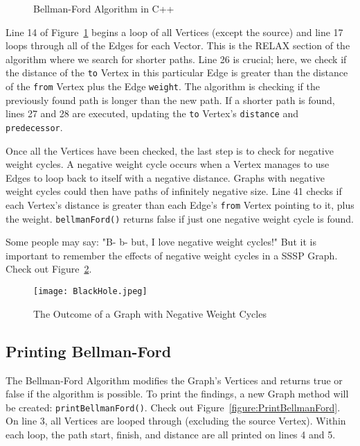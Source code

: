 \documentclass[letterpaper, 10pt,DIV=13]{scrartcl}
\numberwithin{equation}{section} %
\numberwithin{figure}{section} %
\numberwithin{table}{section} %
\begin{document}
\begin{figure}[ht] 
    \centering 
    
    \caption{Bellman-Ford Algorithm in C++}
    \label{figure:BellmanFord}
\end{figure}

Line 14 of Figure~\ref{figure:BellmanFord} begins a loop of all Vertices (except the source) and line 17 loops through all of the Edges for each Vector. This is the RELAX section of the algorithm where we search for shorter paths. Line 26 is crucial; here, we check if the distance of the \texttt{to} Vertex in this particular Edge is greater than the distance of the \texttt{from} Vertex plus the Edge \texttt{weight}. The algorithm is checking if the previously found path is longer than the new path. If a shorter path is found, lines 27 and 28 are executed, updating the \texttt{to} Vertex's \texttt{distance} and \texttt{predecessor}.

Once all the Vertices have been checked, the last step is to check for negative weight cycles. A negative weight cycle occurs when a Vertex manages to use Edges to loop back to itself with a negative distance. Graphs with negative weight cycles could then have paths of infinitely negative size. Line 41 checks if each Vertex's distance is greater than each Edge's \texttt{from} Vertex pointing to it, plus the weight. \texttt{bellmanFord()} returns false if just one negative weight cycle is found.

Some people may say: "B- b- but, I love negative weight cycles!" But it is important to remember the effects of negative weight cycles in a SSSP Graph. Check out Figure~\ref{figure:NegativeWeight}.


\begin{figure}[h] 
    \centering 
    \texttt{[image: BlackHole.jpeg]}
    \caption{The Outcome of a Graph with Negative Weight Cycles\footnotemark}
    \label{figure:NegativeWeight}
    
\end{figure}

\subsection{Printing Bellman-Ford}
The Bellman-Ford Algorithm modifies the Graph's Vertices and returns true or false if the algorithm is possible. To print the findings, a new Graph method will be created: \texttt{printBellmanFord()}. Check out Figure~\ref{figure:PrintBellmanFord}. On line 3, all Vertices are looped through (excluding the source Vertex). Within each loop, the path start, finish, and distance are all printed on lines 4 and 5. 
\end{document}
